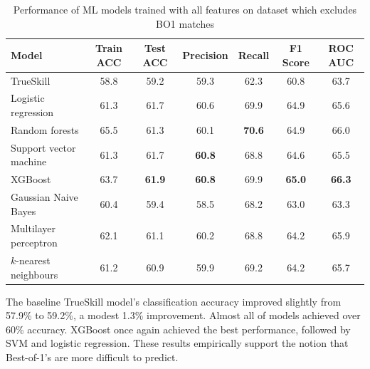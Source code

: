 \begin{table}[h!]
	\centering
	\small
	\begin{adjustbox}{center} %
		\begin{tabular}{ |l|c|c|c|c|c|c| }
			\hline
			\rule{0pt}{2.6ex} \textbf{Model} & \textbf{Train ACC} & \textbf{Test ACC} & \textbf{Precision} & \textbf{Recall} & \textbf{F1 Score} & \textbf{ROC AUC} \\
			\hline
			\rule{0pt}{2.6ex} TrueSkill                 & 58.8 & 59.2 & 59.3 & 62.3 & 60.8 & 63.7 \\ \hline
			\rule{0pt}{2.6ex} Logistic regression       & 61.3 & 61.7 & 60.6 & 69.9 & 64.9 & 65.6 \\
			\rule{0pt}{2.6ex} Random forests            & 65.5 & 61.3 & 60.1 & \textbf{70.6} & 64.9 & 66.0 \\
			\rule{0pt}{2.6ex} Support vector machine    & 61.3 & 61.7 & \textbf{60.8} & 68.8 & 64.6 & 65.5 \\
			\rule{0pt}{2.6ex} XGBoost                   & 63.7 & \textbf{61.9} & \textbf{60.8} & 69.9 & \textbf{65.0} & \textbf{66.3} \\
			\rule{0pt}{2.6ex} Gaussian Naive Bayes      & 60.4 & 59.4 & 58.5 & 68.2 & 63.0 & 63.3 \\
			\rule{0pt}{2.6ex} Multilayer perceptron     & 62.1 & 61.1 & 60.2 & 68.8 & 64.2 & 65.9 \\
			\rule{0pt}{2.6ex} $k$-nearest neighbours 	& 61.2 & 60.9 & 59.9 & 69.2 & 64.2 & 65.7 \\
			\hline
		\end{tabular}
	\end{adjustbox}
	\caption{Performance of ML models trained with all features on dataset which excludes BO1 matches}
	\label{table:3}
\end{table}

The baseline TrueSkill model's classification accuracy improved slightly from 57.9\% to 59.2\%, a modest 1.3\% improvement. Almost all of models achieved over 60\% accuracy. XGBoost once again achieved the best performance, followed by SVM and logistic regression. These results empirically support the notion that Best-of-1's are more difficult to predict.


